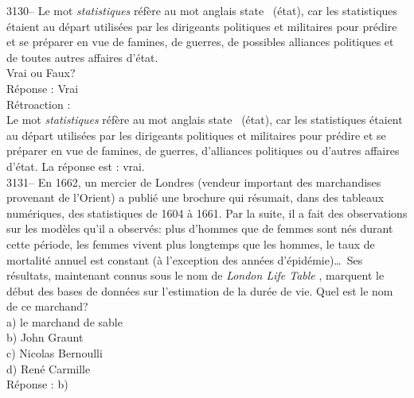 \documentclass[letterpaper, 12pt]{article}
\begin{document}
3130-- Le mot \emph{statistiques} r\'ef\`ere au mot anglais \og state \fg \ (\'etat), car les statistiques \'etaient au d\'epart utilis\'ees par les dirigeants politiques et militaires pour pr\'edire et se pr\'eparer en vue de famines, de guerres, de possibles alliances politiques et de toutes autres affaires d'\'etat.\\
Vrai ou Faux?\\

R\'eponse : Vrai\\

R\'etroaction :\\
Le mot \emph{statistiques} r\'ef\`ere au mot anglais \og state \fg \ (\'etat), car les statistiques \'etaient au d\'epart utilis\'ees par les dirigeants politiques et militaires pour pr\'edire et se pr\'eparer en vue de famines, de guerres, d'alliances politiques ou d'autres affaires d'\'etat. La r\'eponse est : vrai.\\



3131-- En 1662, un mercier de Londres (vendeur important des marchandises provenant de l'Orient) a publi\'e une brochure qui r\'esumait, dans des tableaux num\'eriques, des statistiques de 1604 \`a 1661. Par la suite, il a fait des observations sur les mod\`eles qu'il a observ\'es: plus d'hommes que de femmes sont n\'es durant cette p\'eriode, les femmes vivent plus longtemps que les hommes, le taux de mortalit\'e annuel est constant (\`a l'exception des ann\'ees d'\'epid\'emie)\dots \, Ses r\'esultats, maintenant connus sous le nom de \og \emph{London Life Table} \fg, marquent le d\'ebut des bases de donn\'ees sur l'estimation de la dur\'ee de vie. Quel est le nom de ce marchand?\\

a) le marchand de sable\\
b) John Graunt\\
c) Nicolas Bernoulli\\
d) Ren\'e Carmille\\

R\'eponse : b)\\
\end{document}
